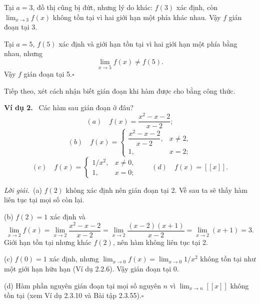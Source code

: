 \documentclass[12pt,a4paper]{article}
\newcommand{\ex}[1]{\par\medskip\noindent\textbf{Ví dụ #1.}\ }
\newcommand{\sol}{\par\noindent\textit{Lời giải.}\ }
\newcommand{\gint}[1]{\left[\!\left[#1\right]\!\right]}
\begin{document}
Tại $a=3$, đồ thị cũng bị đứt, nhưng lý do khác: $f(3)$ xác định, còn $\lim_{x\to3}f(x)$ không tồn tại vì hai giới hạn một phía khác nhau. Vậy $f$ gián đoạn tại 3.

Tại $a=5$, $f(5)$ xác định và giới hạn tồn tại vì hai giới hạn một phía bằng nhau, nhưng
\[\lim_{x\to5}f(x)\ne f(5).\]
Vậy $f$ gián đoạn tại 5.\hfill$\square$

Tiếp theo, xét cách nhận biết gián đoạn khi hàm được cho bằng công thức.
\ex{2} Các hàm sau gián đoạn ở đâu?
\[(a)\quad f(x)=\frac{x^2-x-2}{x-2};\]
\[(b)\quad f(x)=\begin{cases}\dfrac{x^2-x-2}{x-2},&x\ne2,\\1,&x=2;\end{cases}\]
\[(c)\quad f(x)=\begin{cases}1/x^2,&x\ne0,\\1,&x=0;\end{cases}\qquad(d)\quad f(x)=\gint{x}.\]
\sol (a) $f(2)$ không xác định nên gián đoạn tại 2. Về sau ta sẽ thấy hàm liên tục tại mọi số còn lại.

(b) $f(2)=1$ xác định và
\[\lim_{x\to2}f(x)=\lim_{x\to2}\frac{x^2-x-2}{x-2}=\lim_{x\to2}\frac{(x-2)(x+1)}{x-2}=\lim_{x\to2}(x+1)=3.\]
Giới hạn tồn tại nhưng khác $f(2)$, nên hàm không liên tục tại 2.

(c) $f(0)=1$ xác định, nhưng $\lim_{x\to0}f(x)=\lim_{x\to0}1/x^2$ không tồn tại như một giới hạn hữu hạn (Ví dụ 2.2.6). Vậy gián đoạn tại 0.

(d) Hàm phần nguyên gián đoạn tại mọi số nguyên $n$ vì $\lim_{x\to n}\gint{x}$ không tồn tại (xem Ví dụ 2.3.10 và Bài tập 2.3.55).\hfill$\square$
\end{document}
